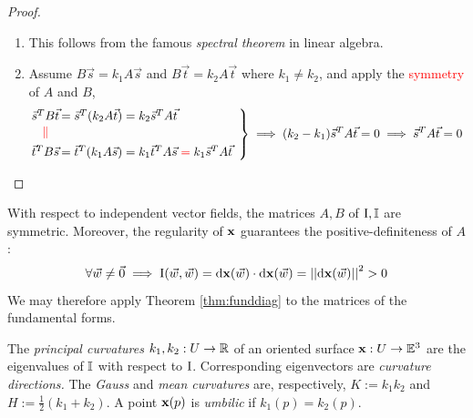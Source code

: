 \begin{proof}
\begin{enumerate}
  \item This follows from the famous \emph{spectral theorem} in linear algebra.\footnotemark 
	\item Assume $B\vec s=k_1A\vec s$ and $B\vec t=k_2A\vec t$ where $k_1\neq k_2$, and apply the \textcolor{red}{symmetry} of $A$ and $B$,
	\[
		\left.
		\begin{array}{@{}c@{\,}l}
			\vec s^TB\vec t &=\vec s^T(k_2A\vec t) =k_2\vec s^TA\vec t\\[1pt]
			\textcolor{red}{\parallel}&\\[4pt]
			\vec t^TB\vec s &=\vec t^T(k_1A\vec s) =k_1\vec t^TA\vec s \mathrel{\textcolor{red}{=}}k_1\vec s^TA\vec t
		\end{array}
		\right\}
		\implies (k_2-k_1)\vec s^TA\vec t=0
		\implies \vec s^TA\vec t=0
	\tag*{\qedhere}
	\]
\end{enumerate}
\end{proof}



{}

With respect to independent vector fields, the matrices $A,B$ of $\mathrm{I},\mathbb{I}$ are symmetric. Moreover, the regularity of ${\mathbf{x}}$ guarantees the positive-definiteness of $A$:
\[
	\forall \vec w\neq\vec 0\implies \mathrm{I}(\vec w,\vec w)=\mathrm{d}{\mathbf{x}}(\vec w)\cdot\mathrm{d}{\mathbf{x}}(\vec w)=\left| \left| \mathrm{d}{\mathbf{x}}(\vec w)\right|\right|^2>0
\]
We may therefore apply Theorem \ref{thm:funddiag} to the matrices of the fundamental forms.

\begin{defn}{}{}
	The \emph{principal curvatures} $k_1,k_2:U\to\mathbb{R}$ of an oriented surface ${\mathbf{x}}:U\to\mathbb{E}^3$ are the eigenvalues of $\mathbb{I}$ with respect to $\mathrm{I}$. Corresponding eigenvectors	are \emph{curvature directions.}
	\smallbreak
	The \emph{Gauss} and \emph{mean curvatures} are, respectively, $K:=k_1k_2$ and $H:=\frac 12(k_1+k_2)$.
	\smallbreak
	A point ${\mathbf{x}}(p)$ is \emph{umbilic} if $k_1(p)=k_2(p)$.
\end{defn}

